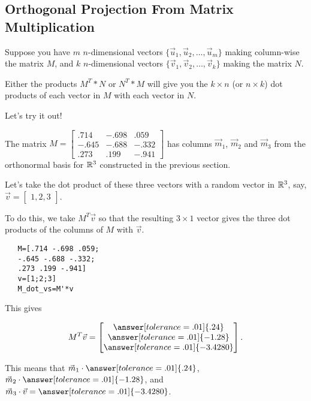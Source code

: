 \documentclass{ximera}
\begin{document}
\subsection*{Orthogonal Projection From Matrix Multiplication}

Suppose you have $m$ $n$-dimensional vectors $\lbrace \vec{u}_1, \vec{u}_2, \ldots, \vec{u}_m\rbrace$ making column-wise the matrix $M$, and $k$ $n$-dimensional vectors $\lbrace \vec{v}_1, \vec{v}_2, \ldots, \vec{v}_k\rbrace$ making the matrix $N$. 

Either the products $M^T*N$ or $N^T*M$ will give you the $k\times n$ (or $n\times k$) dot products of each vector in $M$ with each vector in $N$.

Let's try it out!

\begin{example}

   The matrix $M=\begin{bmatrix}
         .714 & -.698 &.059\\-.645&-.688&-.332\\.273&.199&-.941
      \end{bmatrix}$ has columns $\vec{m}_1$, $\vec{m}_2$ and $\vec{m}_3$ from the orthonormal basis for $\mathbb{R}^3$ constructed in the previous section. 

   Let's take the dot product of these three vectors with a random vector in $\mathbb{R}^3$, say, $\vec{v}=\begin{bmatrix}
      1, 2, 3
   \end{bmatrix}$. 

   To do this, we take $M^T\vec{v}$ so that the resulting $3\times 1$ vector gives the three dot products of the columns of $M$ with $\vec{v}$.

   \begin{verbatim}
   M=[.714 -.698 .059;
   -.645 -.688 -.332;
   .273 .199 -.941]
   v=[1;2;3]
   M_dot_vs=M'*v
   \end{verbatim}
   
   This gives

   $$M^T\vec{v}=\begin{bmatrix}
      \answer[tolerance=.01]{.24}\\\answer[tolerance=.01]{-1.28}\\\answer[tolerance=.01]{-3.4280}
   \end{bmatrix}.$$

   This means that $\vec{m}_1\cdot \answer[tolerance=.01]{.24}$, $\vec{m}_2\cdot\answer[tolerance=.01]{-1.28}$, and $\vec{m}_3\cdot\vec{v}=\answer[tolerance=.01]{-3.4280}$.


\end{example}
\end{document}
